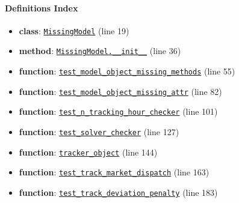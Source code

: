 \documentclass[11pt]{report}
\begin{document}
\paragraph{Definitions Index}
\begin{itemize}[leftmargin=*]
  \item \textbf{class}: \hyperref[def:tests-test_tracker.py:MissingModel:L19]{\texttt{MissingModel}} (line 19)
  \item \textbf{method}: \hyperref[def:tests-test_tracker.py:MissingModel.__init__:L36]{\texttt{MissingModel.\_\_init\_\_}} (line 36)
  \item \textbf{function}: \hyperref[def:tests-test_tracker.py:test_model_object_missing_methods:L55]{\texttt{test\_model\_object\_missing\_methods}} (line 55)
  \item \textbf{function}: \hyperref[def:tests-test_tracker.py:test_model_object_missing_attr:L82]{\texttt{test\_model\_object\_missing\_attr}} (line 82)
  \item \textbf{function}: \hyperref[def:tests-test_tracker.py:test_n_tracking_hour_checker:L101]{\texttt{test\_n\_tracking\_hour\_checker}} (line 101)
  \item \textbf{function}: \hyperref[def:tests-test_tracker.py:test_solver_checker:L127]{\texttt{test\_solver\_checker}} (line 127)
  \item \textbf{function}: \hyperref[def:tests-test_tracker.py:tracker_object:L144]{\texttt{tracker\_object}} (line 144)
  \item \textbf{function}: \hyperref[def:tests-test_tracker.py:test_track_market_dispatch:L163]{\texttt{test\_track\_market\_dispatch}} (line 163)
  \item \textbf{function}: \hyperref[def:tests-test_tracker.py:test_track_deviation_penalty:L183]{\texttt{test\_track\_deviation\_penalty}} (line 183)
\end{itemize}
\end{document}
